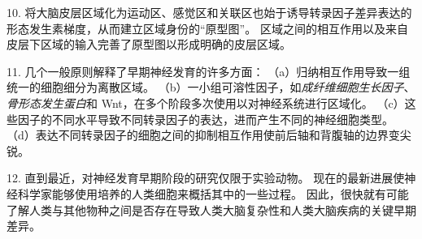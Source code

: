 10. 将大脑皮层区域化为运动区、感觉区和关联区也始于诱导转录因子差异表达的形态发生素梯度，从而建立区域身份的“原型图”。
区域之间的相互作用以及来自皮层下区域的输入完善了原型图以形成明确的皮层区域。 


11. 几个一般原则解释了早期神经发育的许多方面： 
（a）归纳相互作用导致一组统一的细胞细分为离散区域。
（b）一小组可溶性因子，如\textit{成纤维细胞生长因子}、\textit{骨形态发生蛋白}和 Wnt，在多个阶段多次使用以对神经系统进行区域化。
（c）这些因子的不同水平导致不同转录因子的表达，进而产生不同的神经细胞类型。
（d）表达不同转录因子的细胞之间的抑制相互作用使前后轴和背腹轴的边界变尖锐。


12. 直到最近，对神经发育早期阶段的研究仅限于实验动物。
现在的最新进展使神经科学家能够使用培养的人类细胞来概括其中的一些过程。
因此，很快就有可能了解人类与其他物种之间是否存在导致人类大脑复杂性和人类大脑疾病的关键早期差异。

